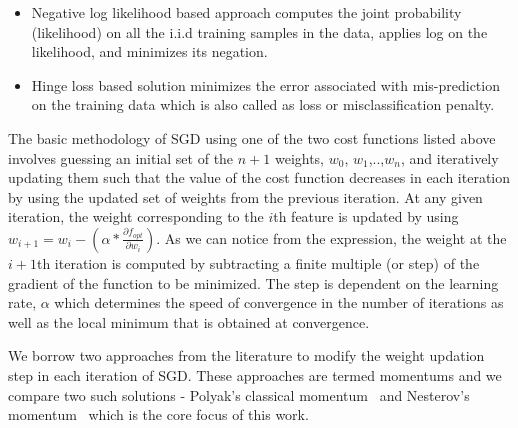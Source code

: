 \begin{itemize}
	\item Negative log likelihood based approach computes the joint probability (likelihood) on all the i.i.d training samples in the data, applies log on the likelihood, and minimizes its negation.
	\item Hinge loss based solution minimizes the error associated with mis-prediction on the training data which is also called as loss or misclassification penalty. 
\end{itemize}

The basic methodology of SGD using one of the two cost functions listed above involves guessing an initial set of the $n+1$ weights, $w_0$, $w_1$,..,$w_n$, and iteratively updating them such that the value of the cost function decreases in each iteration by using the updated set of weights from the previous iteration. At any given iteration, the weight corresponding to the $i$th feature is updated by using $ w_{i+1} = w_i - (\alpha * \frac{\partial f_{opt}}{\partial w_i}) $. As we can notice from the expression, the weight at the $i+1$th iteration is computed by subtracting a finite multiple (or step) of the gradient of the function to be minimized. The step is dependent on the learning rate, $\alpha$ which determines the speed of convergence in the number of iterations as well as the local minimum that is obtained at convergence. 

We borrow two approaches from the literature to modify the weight updation step in each iteration of SGD. These approaches are termed momentums and we compare two such solutions - Polyak's classical momentum~\cite{polyak} and Nesterov's momentum~\cite{nesterov} which is the core focus of this work. 

